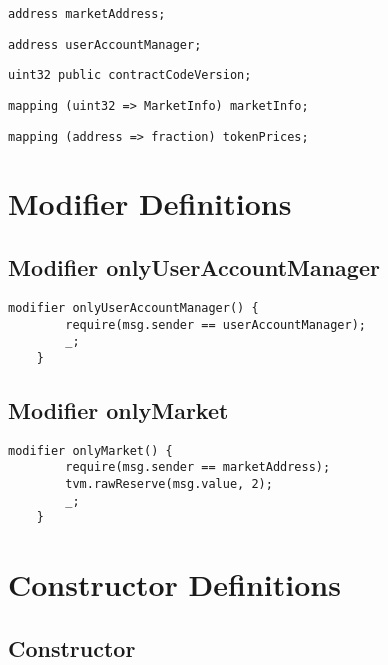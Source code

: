 \begin{lstlisting}[firstnumber=9]
    address marketAddress;
\end{lstlisting}

\begin{lstlisting}[firstnumber=10]
    address userAccountManager;
\end{lstlisting}

\begin{lstlisting}[firstnumber=11]
    uint32 public contractCodeVersion;
\end{lstlisting}

\begin{lstlisting}[firstnumber=13]
    mapping (uint32 => MarketInfo) marketInfo;
\end{lstlisting}

\begin{lstlisting}[firstnumber=14]
    mapping (address => fraction) tokenPrices;
\end{lstlisting}

\section{Modifier Definitions}


\subsection{Modifier onlyUserAccountManager}


\begin{lstlisting}[firstnumber=175]
    modifier onlyUserAccountManager() {
        require(msg.sender == userAccountManager);
        _;
    }
\end{lstlisting}

\subsection{Modifier onlyMarket}


\begin{lstlisting}[firstnumber=180]
    modifier onlyMarket() {
        require(msg.sender == marketAddress);
        tvm.rawReserve(msg.value, 2);
        _;
    }
\end{lstlisting}

\section{Constructor Definitions}


\subsection{Constructor}

